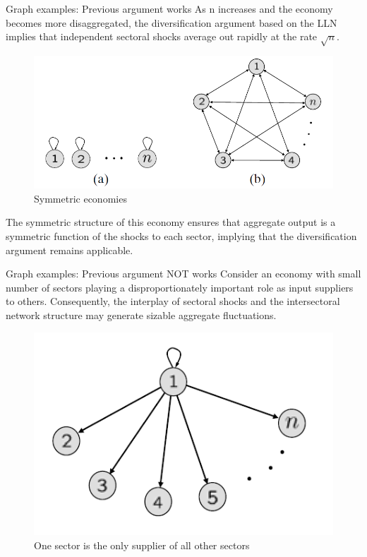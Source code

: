 \documentclass[dvipsnames]{beamer}
\begin{document}
\begin{frame}{Graph examples: Previous argument works}
    \justifying
   As n increases and the economy becomes more disaggregated,
    the diversification argument based on the LLN
    implies that independent sectoral shocks average out rapidly at the rate
    $\sqrt{n}$.
    
    \begin{figure}[H]
      \caption*{Symmetric economies}
      \includegraphics[scale=0.7]{1}
      \centering
    \end{figure}

The symmetric
structure of this economy ensures that aggregate output is a symmetric
function of the shocks to each sector, implying that the diversification argument
remains applicable.

\end{frame}
\begin{frame}{Graph examples: Previous argument NOT works}
    \justifying
    Consider  an economy with small number of sectors playing a disproportionately
    important role as input suppliers to others. Consequently, the
    interplay of sectoral shocks and the intersectoral network structure may generate
    sizable aggregate fluctuations.
    
    \begin{figure}[H]
      \caption*{One sector is the only supplier of all other sectors}
      \includegraphics[scale=0.7]{2}
      \centering
    \end{figure}
\end{frame}
\end{document}
